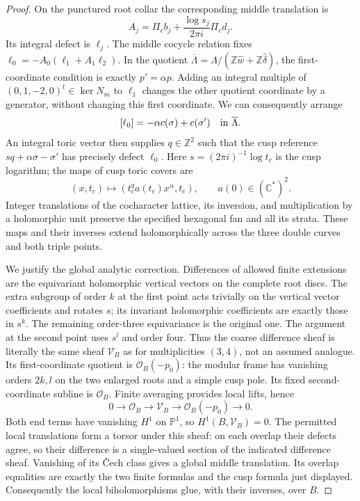 \begin{proof}
On the punctured root collar the corresponding middle translation is
\[
 A_j=\Pi_cb_j+\frac{\log s_j}{2\pi i}\Pi_cd_j.
\]
Its integral defect is $\ell_j$.  The middle cocycle relation fixes
$\ell_0=-A_0(\ell_1+A_1\ell_2)$.  In the quotient
$\overline\Lambda=\Lambda/(\mathbb Z\widehat w+\mathbb Z\widehat\delta)$,
the first-coordinate condition is exactly $p'=\alpha p$.
Adding an integral multiple of $(0,1,-2,0)^t\in\ker N_m$ to
$\ell_1$ changes the other quotient coordinate by a generator,
without changing this first coordinate.  We can consequently arrange
\[
 [\ell_0]=-\alpha c(\sigma)+c(\sigma')\quad\hbox{in }\overline\Lambda.
\]
An integral toric vector then supplies $q\in\mathbb Z^2$ such that
the cusp reference $sq+\alpha\sigma-\sigma'$ has precisely defect
$\ell_0$.  Here $s=(2\pi i)^{-1}\log t_c$ is the cusp logarithm;
the maps of cusp toric covers are
\[
 (x,t_c)\longmapsto(t_c^q a(t_c)x^\alpha,t_c),
 \qquad a(0)\in(\mathbb C^*)^2.
\]
Integer translations of the cocharacter lattice, its inversion,
and multiplication by a holomorphic unit preserve the specified
hexagonal fan and all its strata.  These maps and their inverses
extend holomorphically across the three double curves and both
triple points.

We justify the global analytic correction.  Differences of allowed
finite extensions are the equivariant holomorphic vertical vectors
on the complete root discs.  The extra subgroup of order $k$ at
the first point acts trivially on the vertical vector coefficients
and rotates $s$; its invariant holomorphic coefficients are exactly
those in $s^k$.  The remaining order-three equivariance is the
original one.  The argument at the second point uses $s^l$ and
order four.  Thus the coarse difference sheaf is literally the same
sheaf $\mathcal V_B$ as for multiplicities $(3,4)$, not an assumed
analogue.  Its first-coordinate quotient is
$\mathcal O_B(-p_0)$: the modular frame has vanishing orders $2k,l$
on the two enlarged roots and a simple cusp pole.  Its fixed
second-coordinate subline is $\mathcal O_B$.  Finite averaging
provides local lifts, hence
\[
 0\longrightarrow\mathcal O_B\longrightarrow\mathcal V_B
 \longrightarrow\mathcal O_B(-p_0)\longrightarrow0.
\]
Both end terms have vanishing $H^1$ on $\mathbb P^1$, so
$H^1(B,\mathcal V_B)=0$.  The permitted local translations form a
torsor under this sheaf: on each overlap their defects agree, so
their difference is a single-valued section of the indicated
difference sheaf.  Vanishing of its \v Cech class gives a global
middle translation.  Its overlap equalities are exactly the two
finite formulas and the cusp formula just displayed.  Consequently
the local biholomorphisms glue, with their inverses, over $B$.


\end{proof}
